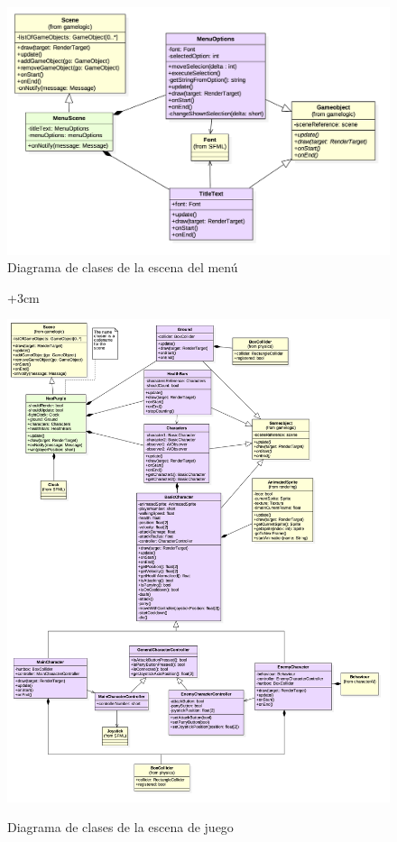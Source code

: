 \begin{figure}
	\centerline{\includegraphics[width=15cm]{otros/UML/png/alld/png/gamelogic__menu__diagramaDeClases_scene_menu_6.png}}
	\caption{Diagrama de clases de la escena del menú}
	\label{class:scene}
\end{figure}

\begin{figure}
	\begin{adjustwidth}{+3cm}{}
	\caption{Diagrama de clases de la escena de juego}
	\centerline{\includegraphics[width=20cm]{otros/UML/png/alld/png/gamelogic__gameplay__diagramaDeClases_scene_gameplay_4.png}}
	\label{class:gameplay}
\end{adjustwidth}
\end{figure}

